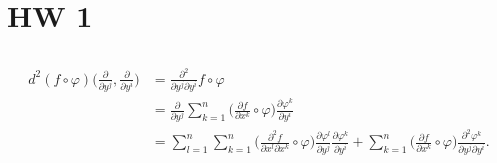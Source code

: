 \section{HW 1}

\subsection{} %

\subsubsection{} %

\begin{align}
    d^2 (f\circ\varphi)\bigg(\frac{\partial}{\partial y^j},\frac{\partial}{\partial y^i}\bigg)
        &= \frac{\partial^2}{\partial y^j\partial y^i}f\circ\varphi \\
        &= \frac{\partial}{\partial y^j} \sum_{k=1}^n \bigg(\frac{\partial f}{\partial x^k}\circ\varphi\bigg)\frac{\partial \varphi^k}{\partial y^i} \\
        &= \sum_{l=1}^n\sum_{k=1}^n \bigg(\frac{\partial^2 f}{\partial x^l\partial x^k}\circ\varphi\bigg)\frac{\partial \varphi^l}{\partial y^j}\frac{\partial \varphi^k}{\partial y^i}
            + \sum_{k=1}^n \bigg(\frac{\partial f}{\partial x^k}\circ\varphi\bigg)\frac{\partial^2 \varphi^k}{\partial y^j\partial y^i}.
\end{align}

\subsubsection{} %

